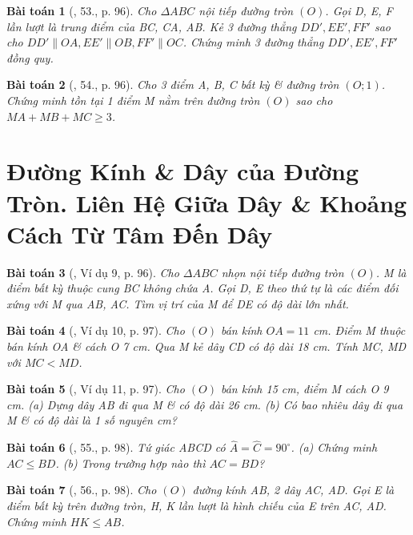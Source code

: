 \documentclass{article}
\newtheorem{baitoan}{Bài toán}
\begin{document}
\begin{baitoan}[\cite{Binh_Toan_9_tap_1}, 53., p. 96]
	Cho $\Delta ABC$ nội tiếp đường tròn $(O)$. Gọi D, E, F lần lượt là trung điểm của BC, CA, AB. Kẻ 3 đường thẳng $DD',EE',FF'$ sao cho $DD'\parallel OA,EE'\parallel OB,FF'\parallel OC$. Chứng minh 3 đường thẳng $DD',EE',FF'$ đồng quy.
\end{baitoan}

\begin{baitoan}[\cite{Binh_Toan_9_tap_1}, 54., p. 96]
	Cho 3 điểm A, B, C bất kỳ \& đường tròn $(O;1)$. Chứng minh tồn tại 1 điểm M nằm trên đường tròn $(O)$ sao cho $MA + MB + MC\ge3$.
\end{baitoan}


\section{Đường Kính \& Dây của Đường Tròn. Liên Hệ Giữa Dây \& Khoảng Cách Từ Tâm Đến Dây}

\begin{baitoan}[\cite{Binh_Toan_9_tap_1}, Ví dụ 9, p. 96]
	Cho $\Delta ABC$ nhọn nội tiếp đường tròn $(O)$. M là điểm bất kỳ thuộc cung BC không chứa A. Gọi D, E theo thứ tự là các điểm đối xứng với M qua AB, AC. Tìm vị trí của M để DE có độ dài lớn nhất.
\end{baitoan}

\begin{baitoan}[\cite{Binh_Toan_9_tap_1}, Ví dụ 10, p. 97]
	Cho $(O)$ bán kính $OA = 11$ {\rm cm}. Điểm M thuộc bán kính OA \& cách O {\rm7 cm}. Qua M kẻ dây CD có độ dài {\rm18 cm}. Tính MC, MD với $MC < MD$.
\end{baitoan}

\begin{baitoan}[\cite{Binh_Toan_9_tap_1}, Ví dụ 11, p. 97]
	Cho $(O)$ bán kính {\rm15 cm}, điểm M cách O {\rm9 cm}. (a) Dựng dây AB đi qua M \& có độ dài {\rm26 cm}. (b) Có bao nhiêu dây đi qua M \& có độ dài là 1 số nguyên {\rm cm}?
\end{baitoan}

\begin{baitoan}[\cite{Binh_Toan_9_tap_1}, 55., p. 98]
	Tứ giác ABCD có $\widehat{A} = \widehat{C} = 90^\circ$. (a) Chứng minh $AC\le BD$. (b) Trong trường hợp nào thì $AC = BD$?
\end{baitoan}

\begin{baitoan}[\cite{Binh_Toan_9_tap_1}, 56., p. 98]
	Cho $(O)$ đường kính AB, 2 dây AC, AD. Gọi E là điểm bất kỳ trên đường tròn, H, K lần lượt là hình chiếu của E trên AC, AD. Chứng minh $HK\le AB$.
\end{baitoan}
\end{document}

